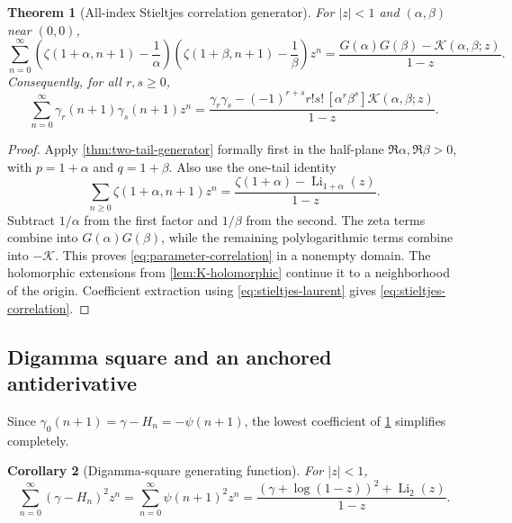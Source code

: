 \documentclass[11pt]{article}
\newtheorem{theorem}{Theorem}[section]
\newtheorem{corollary}[theorem]{Corollary}
\theoremstyle{definition}
\newcommand{\Li}{\operatorname{Li}}
\newcommand{\K}{\mathcal{K}}
\begin{document}
\begin{theorem}[All-index Stieltjes correlation generator]
\label{thm:stieltjes-correlation-generator}
For $|z|<1$ and $(\alpha,\beta)$ near $(0,0)$,
\begin{equation}
 \boxed{\displaystyle
 \sum_{n=0}^{\infty}
 \left(\zeta(1+\alpha,n+1)-\frac1\alpha\right)
 \left(\zeta(1+\beta,n+1)-\frac1\beta\right)z^n
 =\frac{G(\alpha)G(\beta)-\K(\alpha,\beta;z)}{1-z}.}
 \label{eq:parameter-correlation}
\end{equation}
Consequently, for all $r,s\ge0$,
\begin{equation}
 \boxed{\displaystyle
 \sum_{n=0}^{\infty}\gamma_r(n+1)\gamma_s(n+1)z^n
 =\frac{\gamma_r\gamma_s
 -(-1)^{r+s}r!s!\,[\alpha^r\beta^s]
       \K(\alpha,\beta;z)}{1-z}.}
 \label{eq:stieltjes-correlation}
\end{equation}
\end{theorem}

\begin{proof}
Apply \cref{thm:two-tail-generator} formally first in the half-plane
$\Re\alpha,\Re\beta>0$, with $p=1+\alpha$ and $q=1+\beta$.  Also use
the one-tail identity
\[
 \sum_{n\ge0}\zeta(1+\alpha,n+1)z^n
 =\frac{\zeta(1+\alpha)-\Li_{1+\alpha}(z)}{1-z}.
\]
Subtract $1/\alpha$ from the first factor and $1/\beta$ from the
second.  The zeta terms combine into $G(\alpha)G(\beta)$, while the
remaining polylogarithmic terms combine into $-\K$.  This proves
\eqref{eq:parameter-correlation} in a nonempty domain.  The holomorphic
extensions from \cref{lem:K-holomorphic} continue it to a neighborhood
of the origin.  Coefficient extraction using
\eqref{eq:stieltjes-laurent} gives
\eqref{eq:stieltjes-correlation}.
\end{proof}

\subsection{Digamma square and an anchored antiderivative}

Since $\gamma_0(n+1)=\gamma-H_n=-\psi(n+1)$, the lowest coefficient of
\cref{thm:stieltjes-correlation-generator} simplifies completely.

\begin{corollary}[Digamma-square generating function]
\label{cor:digamma-square}
For $|z|<1$,
\begin{equation}
 \boxed{\displaystyle
 \sum_{n=0}^{\infty}(\gamma-H_n)^2z^n
 =\sum_{n=0}^{\infty}\psi(n+1)^2z^n
 =\frac{(\gamma+\log(1-z))^2+\Li_2(z)}{1-z}.}
 \label{eq:digamma-square}
\end{equation}
\end{corollary}
\end{document}

